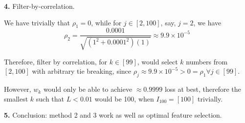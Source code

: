\documentclass[a4paper, 10pt]{article}
\begin{document}
\begin{problem} [Problem 1]
    \textbf{4.} Filter-by-correlation.

    We have trivially that $\rho_1 = 0$, while for $j \in [2, 100]$, say, $j = 2$, we have \begin{equation*}
    \rho_2 = \frac{0.0001}{\sqrt{(1^2 + 0.0001^2) (1)}}  \approx 9.9 \times 10^{-5}
    \end{equation*}

    Therefore, filter by correlation, for $k \in [99]$, would select $k$ numbers from $[2, 100]$ with arbitrary tie breaking, since $\rho_j \approx 9.9 \times 10^{-5} > 0 = \rho_1 \forall j \in [99]$.

    However, $w_k$ would only be able to achieve $\approx 0.9999$ loss at best, therefore the smallest $k$ such that $L < 0.01$ would be 100, when $I_{100} = [100]$ trivially.

    \textbf{5.} Conclusion: method 2 and 3 work as well as optimal feature selection.
\end{problem}
\end{document}
